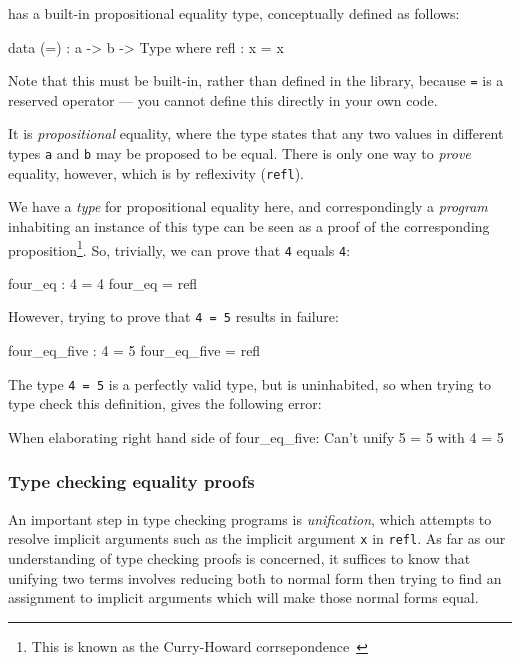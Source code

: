 \Idris{} has a built-in propositional equality type, conceptually defined as
follows:

\begin{code}
data (=) : a -> b -> Type where
     refl : x = x
\end{code}

\noindent
Note that this must be built-in, rather than defined in the library,
because \texttt{=} is a reserved operator --- you cannot define this directly
in your own code. 

It is \emph{propositional}
equality, where the type states that any two values in different types
\texttt{a} and \texttt{b} may be proposed to be equal.
There is only one way to \emph{prove} equality, however, which is by
reflexivity (\texttt{refl}). 

We have a \emph{type} for propositional equality here, and correspondingly
a \emph{program} inhabiting an instance of this type can be seen as a proof 
of the corresponding proposition\footnote{This is known as the Curry-Howard
corrsepondence~\cite{howard}}.
So, trivially, we can prove that \texttt{4}
equals \texttt{4}:

\begin{code}
four_eq : 4 = 4
four_eq = refl
\end{code}

\noindent
However, trying to prove that \texttt{4 = 5} results in failure:

\begin{code}
four_eq_five : 4 = 5
four_eq_five = refl
\end{code}

\noindent
The type \texttt{4 = 5} is a perfectly valid type, but is uninhabited, so
when trying to type check this definition, \Idris{} gives the following
error:

\begin{code}
When elaborating right hand side of four_eq_five:
Can't unify
        5 = 5
with
        4 = 5
\end{code}

\subsubsection*{Type checking equality proofs}

An important step in type checking \Idris{} programs is \emph{unification},
which attempts to resolve implicit arguments such as the implicit argument
\texttt{x} in \texttt{refl}. As far as our understanding of type checking
proofs is concerned, it suffices to know that unifying two terms involves
reducing both to normal form then trying to find an assignment to implicit
arguments which will make those normal forms equal.

